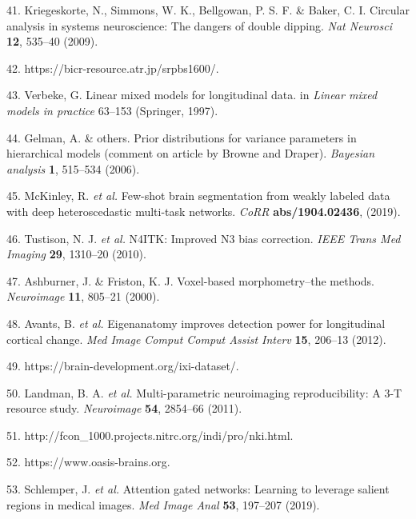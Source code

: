 \documentclass[12pt,]{article}
\begin{document}
\leavevmode\hypertarget{ref-Kriegeskorte:2009aa}{}%
41. Kriegeskorte, N., Simmons, W. K., Bellgowan, P. S. F. \& Baker, C.
I. Circular analysis in systems neuroscience: The dangers of double
dipping. \emph{Nat Neurosci} \textbf{12}, 535--40 (2009).

\leavevmode\hypertarget{ref-srpb}{}%
42. https://bicr-resource.atr.jp/srpbs1600/.

\leavevmode\hypertarget{ref-verbeke1997linear}{}%
43. Verbeke, G. Linear mixed models for longitudinal data. in
\emph{Linear mixed models in practice} 63--153 (Springer, 1997).

\leavevmode\hypertarget{ref-gelman2006prior}{}%
44. Gelman, A. \& others. Prior distributions for variance parameters in
hierarchical models (comment on article by Browne and Draper).
\emph{Bayesian analysis} \textbf{1}, 515--534 (2006).

\leavevmode\hypertarget{ref-deepscan}{}%
45. McKinley, R. \emph{et al.} Few-shot brain segmentation from weakly
labeled data with deep heteroscedastic multi-task networks. \emph{CoRR}
\textbf{abs/1904.02436}, (2019).

\leavevmode\hypertarget{ref-Tustison:2010ac}{}%
46. Tustison, N. J. \emph{et al.} N4ITK: Improved N3 bias correction.
\emph{IEEE Trans Med Imaging} \textbf{29}, 1310--20 (2010).

\leavevmode\hypertarget{ref-Ashburner:2000aa}{}%
47. Ashburner, J. \& Friston, K. J. Voxel-based morphometry--the
methods. \emph{Neuroimage} \textbf{11}, 805--21 (2000).

\leavevmode\hypertarget{ref-Avants:2012aa}{}%
48. Avants, B. \emph{et al.} Eigenanatomy improves detection power for
longitudinal cortical change. \emph{Med Image Comput Comput Assist
Interv} \textbf{15}, 206--13 (2012).

\leavevmode\hypertarget{ref-ixi}{}%
49. https://brain-development.org/ixi-dataset/.

\leavevmode\hypertarget{ref-Landman:2011aa}{}%
50. Landman, B. A. \emph{et al.} Multi-parametric neuroimaging
reproducibility: A 3-T resource study. \emph{Neuroimage} \textbf{54},
2854--66 (2011).

\leavevmode\hypertarget{ref-nki}{}%
51. http://fcon\_1000.projects.nitrc.org/indi/pro/nki.html.

\leavevmode\hypertarget{ref-oasis}{}%
52. https://www.oasis-brains.org.

\leavevmode\hypertarget{ref-Schlemper:2019aa}{}%
53. Schlemper, J. \emph{et al.} Attention gated networks: Learning to
leverage salient regions in medical images. \emph{Med Image Anal}
\textbf{53}, 197--207 (2019).
\end{document}
